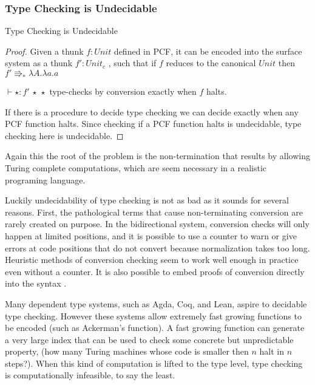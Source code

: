\subsubsection{Type Checking is Undecidable}
\begin{thm}
Type Checking is Undecidable
\end{thm}

\begin{proof}
Given a thunk $f:Unit$ defined in PCF, it can be encoded into the surface system as a thunk $f':Unit_{c}$ , such that if $f$ reduces to the canonical $Unit$ then $f'\Rrightarrow_{\ast}\lambda A.\lambda a.a$ 

$\vdash\star:f'\,\star\,\star$ type-checks by conversion exactly when $f$ halts.

If there is a procedure to decide type checking we can decide exactly when any PCF function halts.
Since checking if a PCF function halts is undecidable, type checking here is undecidable.

\end{proof}
Again this the root of the problem is the non-termination that results by allowing Turing complete computations, which are seem necessary in a realistic programing language.

Luckily undecidability of type checking is not as bad as it sounds for several reasons.
First, the pathological terms that cause non-terminating conversion are rarely created on purpose.
In the bidirectional system, conversion checks will only happen at limited positions, and it is possible to use a counter to warn or give errors at code positions that do not convert because normalization takes too long.
Heuristic methods of conversion checking seem to work well enough in practice even without a counter.
It is also possible to embed proofs of conversion directly into the syntax \cite{sjoberg2012irrelevance}.

Many dependent type systems, such as Agda, Coq, and Lean, aspire to decidable type checking.
However these systems allow extremely fast growing functions to be encoded (such as Ackerman's function).
A fast growing function can generate a very large index that can be used to check some concrete but unpredictable property, (how many Turing machines whose code is smaller then $n$ halt in $n$ steps?).
When this kind of computation is lifted to the type level, type checking is computationally infeasible, to say the least.



